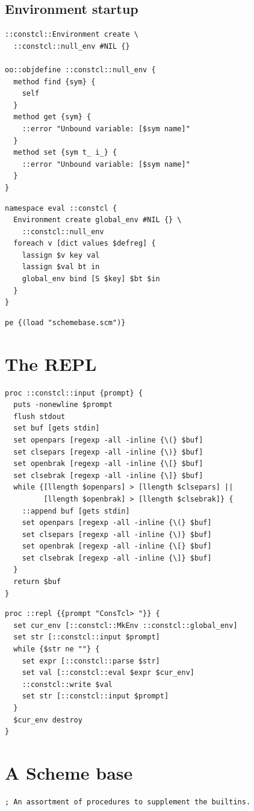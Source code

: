\documentclass[twoside,9pt]{report}
\begin{document}
\section{Environment startup}
\label{environment-startup}
\begin{lstlisting}
::constcl::Environment create \
  ::constcl::null_env #NIL {}

oo::objdefine ::constcl::null_env {
  method find {sym} {
    self
  }
  method get {sym} {
    ::error "Unbound variable: [$sym name]"
  }
  method set {sym t_ i_} {
    ::error "Unbound variable: [$sym name]"
  }
}
\end{lstlisting}
\begin{lstlisting}
namespace eval ::constcl {
  Environment create global_env #NIL {} \
    ::constcl::null_env
  foreach v [dict values $defreg] {
    lassign $v key val
    lassign $val bt in
    global_env bind [S $key] $bt $in
  }
}
\end{lstlisting}
\begin{lstlisting}
pe {(load "schemebase.scm")}
\end{lstlisting}
\chapter{The REPL}
\label{the-repl}
\begin{lstlisting}
proc ::constcl::input {prompt} {
  puts -nonewline $prompt
  flush stdout
  set buf [gets stdin]
  set openpars [regexp -all -inline {\(} $buf]
  set clsepars [regexp -all -inline {\)} $buf]
  set openbrak [regexp -all -inline {\[} $buf]
  set clsebrak [regexp -all -inline {\]} $buf]
  while {[llength $openpars] > [llength $clsepars] ||
         [llength $openbrak] > [llength $clsebrak]} {
    ::append buf [gets stdin]
    set openpars [regexp -all -inline {\(} $buf]
    set clsepars [regexp -all -inline {\)} $buf]
    set openbrak [regexp -all -inline {\[} $buf]
    set clsebrak [regexp -all -inline {\]} $buf]
  }
  return $buf
}
\end{lstlisting}
\begin{lstlisting}
proc ::repl {{prompt "ConsTcl> "}} {
  set cur_env [::constcl::MkEnv ::constcl::global_env]
  set str [::constcl::input $prompt]
  while {$str ne ""} {
    set expr [::constcl::parse $str]
    set val [::constcl::eval $expr $cur_env]
    ::constcl::write $val
    set str [::constcl::input $prompt]
  }
  $cur_env destroy
}
\end{lstlisting}
\chapter{A Scheme base}
\label{a-scheme-base}
\begin{lstlisting}
; An assortment of procedures to supplement the builtins.
\end{lstlisting}
\end{document}
